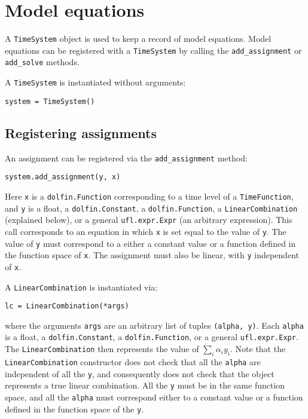 \documentclass[a4paper]{book}
\begin{document}
\section{Model equations}\label{sect:equations}

A \verb+TimeSystem+ object is used to keep a record of model equations.
Model equations can be registered with a \verb+TimeSystem+ by calling the
\verb+add_assignment+ or \verb+add_solve+ methods.

A \verb+TimeSystem+ is instantiated without arguments:
\begin{lstlisting}
system = TimeSystem()
\end{lstlisting}

\subsection{Registering assignments}\label{sect:assignments}

An assignment can be registered via the \verb+add_assignment+ method:
\begin{lstlisting}
system.add_assignment(y, x)
\end{lstlisting}
Here \verb+x+ is a \verb+dolfin.Function+ corresponding to a time level of a
\verb+TimeFunction+, and \verb+y+ is a float, a \verb+dolfin.Constant+, a
\verb+dolfin.Function+, a \verb+LinearCombination+ (explained below), or a
general \verb+ufl.expr.Expr+ (an arbitrary expression). This call corresponds to
an equation in which \verb+x+ is set equal to the value of \verb+y+. The value
of \verb+y+ must correspond to a either a constant value or a function defined
in the function space of \verb+x+. The assignment must also be linear, with
\verb+y+ independent of \verb+x+.

A \verb+LinearCombination+ is instantiated via:
\begin{lstlisting}
lc = LinearCombination(*args)
\end{lstlisting}
where the arguments \verb+args+ are an arbitrary list of tuples
\verb+(alpha, y)+. Each \verb+alpha+ is a float, a \verb+dolfin.Constant+, a
\verb+dolfin.Function+, or a general \linebreak \verb+ufl.expr.Expr+. The
\verb+LinearCombination+ then represents the value of $\sum_i \alpha_i y_i$.
Note that the \verb+LinearCombination+ constructor does not check that all the
\verb+alpha+ are independent of all the \verb+y+, and consequently does not
check that the object represents a true linear combination. All the \verb+y+
must be in the same function space, and all the \verb+alpha+ must correspond
either to a constant value or a function defined in the function space of the
\verb+y+.
\end{document}
